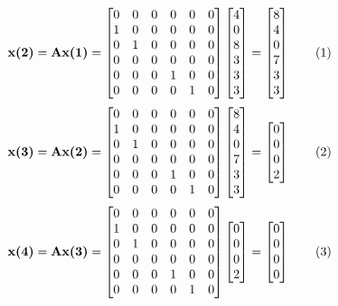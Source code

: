 \documentclass[12pt]{book}
\theoremstyle{plain}
\newcommand\addtag{\refstepcounter{equation}
\renewcommand{\labelenumii}{\theenumii}
\renewcommand{\theenumii}{\theenumi.\arabic{enumii}.}
\tag{\theequation}}
\begin{document}
\[
\textbf{x(2)}=\textbf{Ax(1)}=\A \xI = \xII \addtag
\]
\def \xIII {\begin{bmatrix}
		0 \\ 0 \\ 0 \\ 2
\end{bmatrix}}
\[
\textbf{x(3)}=\textbf{Ax(2)}=\A \xII = \xIII \addtag
\]
\def \xIV {\begin{bmatrix}
		0 \\ 0 \\ 0 \\ 0
\end{bmatrix}}
\[
\textbf{x(4)}=\textbf{Ax(3)}=\A \xIII = \xIV \addtag
\]
%



% 
 
\end{document}
